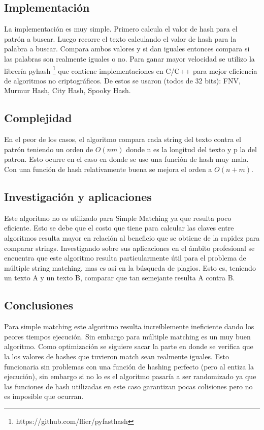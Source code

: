 \documentclass[a4paper, 10pt]{article}
\begin{document}
		\subsection{Implementación}
		
		La implementación es muy simple. Primero calcula el valor de hash para el patrón a buscar. Luego recorre el texto calculando el valor de hash para la palabra a buscar. Compara ambos valores y si dan iguales entonces compara si las palabras son realmente iguales o no. Para ganar mayor velocidad se utilizo la librería pyhash \footnote{https://github.com/flier/pyfasthash} que contiene implementaciones en C/C++ para mejor eficiencia de algoritmos no criptográficos. De estos se usaron (todos de 32 bits): FNV, Murmur Hash, City Hash, Spooky Hash.
		
		\subsection{Complejidad}
		
		En el peor de los casos, el algoritmo compara cada string del texto contra el patrón teniendo un orden de $O(nm)$ donde n es la longitud del texto y p la del patron. Esto ocurre en el caso en donde se use una función de hash muy mala. Con una función de hash relativamente buena se mejora el orden a $O(n+m)$.
		
		\subsection{Investigación y aplicaciones}
		
		Este algoritmo no es utilizado para Simple Matching ya que resulta poco eficiente. Esto se debe que  el costo que tiene para calcular las claves entre algoritmos resulta mayor en relación al beneficio que se obtiene de la rapidez para comparar strings. Investigando sobre sus aplicaciones en el ámbito profesional se encuentra que este algoritmo resulta particularmente útil para el problema de múltiple string matching, mas es así en la búsqueda de plagios. Esto es, teniendo un texto A y un texto B, comparar que tan semejante resulta A contra B.
		
		\subsection{Conclusiones}
		
		Para simple matching este algoritmo resulta increíblemente ineficiente dando los peores tiempos ejecución. Sin embargo para múltiple matching es un muy buen algoritmo. Como optimización se siguiere sacar la parte en donde se verifica que la los valores de hashes que tuvieron match sean realmente iguales. Esto funcionaria sin problemas con una función de hashing perfecto (pero al entiza la ejecución), sin embargo si no lo es el algoritmo pasaría a ser randomizado ya que las funciones de hash utilizadas en este caso garantizan pocas colisiones pero no es imposible que ocurran.
		
\end{document}
